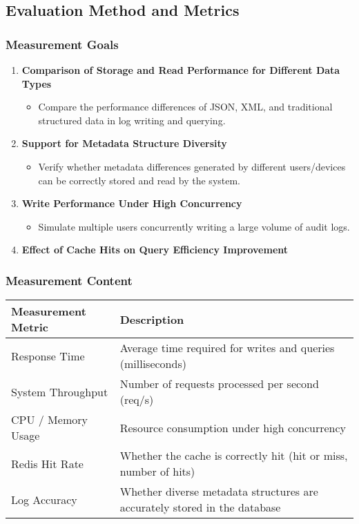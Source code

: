 \documentclass{article}
\begin{document}
\subsection{Evaluation Method and Metrics}

\subsubsection{Measurement Goals}

\begin{enumerate}
    \item \textbf{Comparison of Storage and Read Performance for Different Data Types}
    \begin{itemize}
        \item Compare the performance differences of JSON, XML, and traditional structured data in log writing and querying.
    \end{itemize}
    \item \textbf{Support for Metadata Structure Diversity}
    \begin{itemize}
        \item Verify whether metadata differences generated by different users/devices can be correctly stored and read by the system.
    \end{itemize}
    \item \textbf{Write Performance Under High Concurrency}
    \begin{itemize}
        \item Simulate multiple users concurrently writing a large volume of audit logs.
    \end{itemize}
    \item \textbf{Effect of Cache Hits on Query Efficiency Improvement}
\end{enumerate}

\subsubsection{Measurement Content}

\begin{tabular}{|l|l|}
\hline
\textbf{Measurement Metric} & \textbf{Description} \\
\hline
Response Time & Average time required for writes and queries (milliseconds) \\
System Throughput & Number of requests processed per second (req/s) \\
CPU / Memory Usage & Resource consumption under high concurrency \\
Redis Hit Rate & Whether the cache is correctly hit (hit or miss, number of hits) \\
Log Accuracy & Whether diverse metadata structures are accurately stored in the database \\
\hline
\end{tabular}
\end{document}
